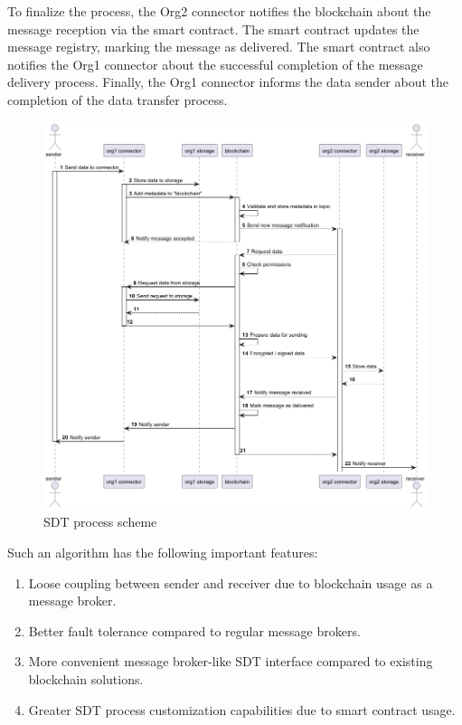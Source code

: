 \documentclass[10pt]{llncs}
\begin{document}
To finalize the process, the Org2 connector notifies the blockchain about the message reception via the smart contract. 
The smart contract updates the message registry, marking the message as delivered. 
The smart contract also notifies the Org1 connector about the successful completion of the message delivery process. 
Finally, the Org1 connector informs the data sender about the completion of the data transfer process.

\begin{figure}
    \includegraphics[width=\textwidth]{sending_process.png}
    \caption{SDT process scheme} \label{sending_process}
\end{figure}

Such an algorithm has the following important features:

\begin{enumerate}
    \item Loose coupling between sender and receiver due to blockchain usage as a message broker.
    \item Better fault tolerance compared to regular message brokers.
    \item More convenient message broker-like SDT interface compared to existing blockchain solutions.
    \item Greater SDT process customization capabilities due to smart contract usage.
\end{enumerate}
\end{document}
